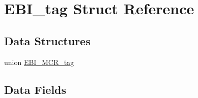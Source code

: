 \hypertarget{structEBI__tag}{}\section{E\+B\+I\+\_\+tag Struct Reference}
\label{structEBI__tag}
\subsection*{Data Structures}
\begin{DoxyCompactItemize}
\item 
union \mbox{\hyperlink{unionEBI__tag_1_1EBI__MCR__tag}{E\+B\+I\+\_\+\+M\+C\+R\+\_\+tag}}
\end{DoxyCompactItemize}
\subsection*{Data Fields}
